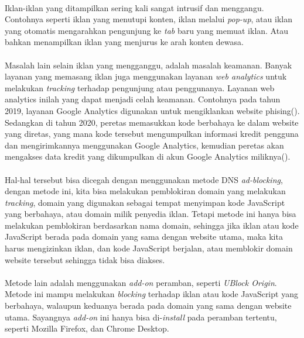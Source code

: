 \documentclass[a4paper,12pt]{article}
\begin{document}
  \paragraph*{} Iklan-iklan yang ditampilkan sering kali
  sangat intrusif dan menggangu. Contohnya seperti iklan
  yang menutupi konten, iklan melalui \textit{pop-up}, atau
  iklan yang otomatis mengarahkan pengunjung ke \textit{tab}
  baru yang memuat iklan. Atau bahkan menampilkan iklan
  yang menjurus ke arah konten dewasa.

  \paragraph*{} Masalah lain selain iklan yang mengganggu,
  adalah masalah keamanan. Banyak layanan yang memasang
  iklan juga menggunakan layanan \textit{web analytics}
  untuk melakukan \textit{tracking} terhadap pengunjung atau
  penggunanya. Layanan web analytics inilah yang dapat
  menjadi celah keamanan. Contohnya pada tahun 2019, layanan
  Google Analytics digunakan untuk mengiklankan website
  phising(\cite{charlie2019}). Sedangkan di tahun 2020,
  peretas memasukkan kode berbahaya ke dalam website yang
  diretas, yang mana kode tersebut mengumpulkan informasi
  kredit pengguna dan mengirimkannya menggunakan Google
  Analytics, kemudian peretas akan mengakses data kredit
  yang dikumpulkan di akun Google Analytics
  miliknya(\cite{ravie2020}).

  \paragraph*{}Hal-hal tersebut bisa dicegah dengan
  menggunakan metode DNS \textit{ad-blocking}, dengan metode
  ini, kita bisa melakukan pemblokiran domain yang melakukan
  \textit{tracking}, domain yang digunakan sebagai
  tempat menyimpan kode JavaScript yang berbahaya, atau
  domain milik penyedia iklan. Tetapi metode
  ini hanya bisa melakukan pemblokiran berdasarkan nama
  domain, sehingga jika iklan atau kode JavaScript berada
  pada domain yang sama dengan website utama, maka kita
  harus mengizinkan iklan, dan kode JavaScript berjalan,
  atau memblokir domain website tersebut sehingga tidak bisa
  diakses.

  \paragraph*{}Metode lain adalah menggunakan
  \textit{add-on} peramban, seperti \textit{UBlock Origin}.
  Metode ini mampu melakukan \textit{blocking} terhadap
  iklan atau kode JavaScript yang berbahaya, walaupun
  keduanya berada pada domain yang sama dengan website
  utama. Sayangnya \textit{add-on} ini hanya bisa
  di-\textit{install} pada peramban tertentu, seperti
  Mozilla Firefox, dan Chrome Desktop.
\end{document}

